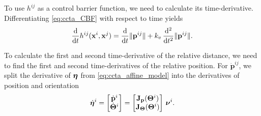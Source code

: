To use $h^{ij}$ as a control barrier function, we need to calculate its time-derivative.
Differentiating \eqref{eq:ccta_CBF} with respect to time yields
\begin{equation}
    \frac{\rm d}{{\rm d}t}h^{ij}(\mathbf{x}^{i}, \mathbf{x}^{j}) = \frac{\rm d}{{\rm d}t}\|\mathbf{p}^{ij}\| + k_v\,\frac{\rm d^2}{{\rm d}t^2}\|\mathbf{p}^{ij}\|.
\end{equation}



To calculate the first and second time-derivative of the relative distance, we need to find the first and second time-derivatives of the relative position.
For $\dot{\mathbf{p}}^{ij}$, we split the derivative of $\bm{\eta}$ from \eqref{eq:ccta_affine_model} into the derivatives of position and orientation \vspace{-2mm}
\begin{equation}
    \dot{\bm{\eta}}^{i} = \begin{bmatrix} \dot{\mathbf{p}}^{i} \\ \dot{\bm{\Theta}}^{i} \end{bmatrix} = \begin{bmatrix}
        \mathbf{J}_{\mathbf{p}}(\bm{\Theta}^{i}) \\ \mathbf{J}_{\bm{\Theta}}(\bm{\Theta}^{i})
    \end{bmatrix}\,\bm{\nu}^{i}.
\end{equation}

